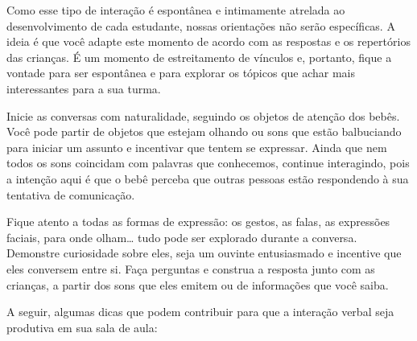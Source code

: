 \documentclass[11pt]{extarticle}
\begin{document}
Como esse tipo de interação é espontânea e intimamente atrelada ao 
desenvolvimento de cada estudante, nossas orientações não serão específicas. 
A ideia é que você adapte este momento de acordo com as respostas e os 
repertórios das crianças. É um momento de estreitamento de vínculos e, portanto, 
fique a vontade para ser espontânea e para explorar os tópicos que achar 
mais interessantes para a sua turma.

Inicie as conversas com naturalidade, seguindo os objetos de atenção dos bebês. 
Você pode partir de objetos que estejam olhando ou sons que estão balbuciando 
para iniciar um assunto e incentivar que tentem se expressar. Ainda que nem 
todos os sons coincidam com palavras que conhecemos, continue interagindo, 
pois a intenção aqui é que o bebê perceba que outras pessoas estão respondendo 
à sua tentativa de comunicação. 

Fique atento a todas as formas de expressão: os gestos, as falas, as 
expressões faciais, para onde olham\ldots{} tudo pode ser explorado durante a conversa. 
Demonstre curiosidade sobre eles, seja um ouvinte entusiasmado e incentive que eles 
conversem entre si. Faça perguntas e construa a resposta junto com as crianças, 
a partir dos sons que eles emitem ou de informações que você saiba. 

A seguir, algumas dicas que podem contribuir para que a interação verbal 
seja produtiva em sua sala de aula: 
\end{document}
